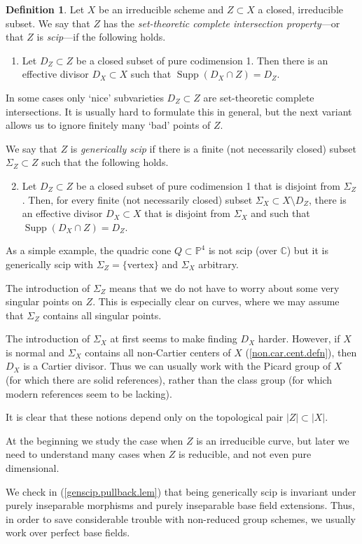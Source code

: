 \documentclass{amsart}
\theoremstyle{definition}
\newtheorem{defn}[thm]{Definition}
\theoremstyle{remark}
\renewcommand{\c}[0]{{\mathbb C}}
\newcommand{\p}[0]{{\mathbb P}}
\newcommand{\supp}[0]{\operatorname{Supp}}
\begin{document}
\begin{defn}\label{ci.defn} Let $X$ be an irreducible scheme and $Z\subset X$ a closed, irreducible  subset.
We say that $Z$ has the {\it set-theoretic complete intersection property}---or that $Z$ is  {\it scip}---if the following holds.
\begin{enumerate}
\item  Let $D_Z\subset Z$ be a closed  subset  of pure codimension 1.   Then there is an effective divisor $D_X\subset X$ 
such that $\supp(D_X\cap Z)=D_Z$.
\end{enumerate}
In some cases only `nice' subvarieties $D_Z\subset Z$  are set-theoretic complete intersections. It is usually hard to formulate this in general, but the next variant allows us to ignore finitely many `bad' points of $Z$. 

We say that $Z$  is  {\it generically scip} if there is a finite (not necessarily closed) subset $\Sigma_Z\subset Z$ such that the following holds.
\begin{enumerate}\setcounter{enumi}{1}
\item  Let $D_Z\subset Z$ be a closed  subset  of pure codimension 1 that is disjoint from $\Sigma_Z$.   Then, 
for every finite (not necessarily closed) subset $\Sigma_X\subset X\setminus D_Z$,
there is an effective divisor $D_X\subset X$ that is disjoint from $\Sigma_X$ and such that $\supp(D_X\cap Z)=D_Z$.
\end{enumerate}
As a simple example, the quadric cone  $Q\subset \p^4$ is not scip  (over $\c$) but it is  generically scip with $\Sigma_Z=\{\mbox{vertex}\}$ and $\Sigma_X$ arbitrary.

The introduction of $\Sigma_Z$ means that we do not have to worry about some very singular points on $Z$. This is especially clear on curves, where we may assume that $\Sigma_Z$ contains all singular points.

The introduction of $\Sigma_X$ at first seems to make finding $D_X$ harder.
However, if $X$ is normal and $\Sigma_X$ contains all non-Cartier centers of $X$   (\ref{non.car.cent.defn}), then $D_X$ is a Cartier divisor. 
Thus we can usually work with the Picard group of $X$ (for which there are solid references), rather than  the class group  (for which modern references seem to be lacking). 

It is clear that these notions  depend only on the topological pair $|Z|\subset |X|$.

At the beginning we study the case when $Z$ is an irreducible  curve,
but later we need to understand many cases when $Z$ is reducible, and not even pure dimensional. 

We check in (\ref{genscip.pullback.lem}) that being generically scip  is invariant under purely inseparable morphisms and purely inseparable base field extensions. Thus, in order to save  considerable trouble with non-reduced group schemes, we usually work over perfect base fields.
\end{defn}
\end{document}

